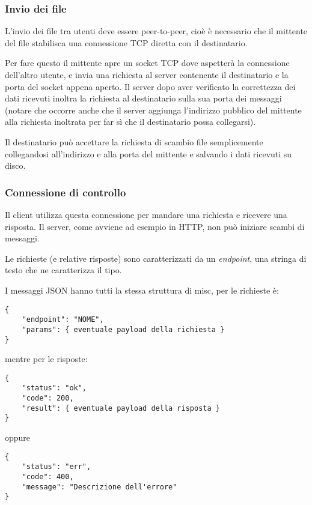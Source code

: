 \subsubsection{Invio dei file}
L'invio dei file tra utenti deve essere peer-to-peer, cioè è necessario che il mittente del file stabilisca una connessione TCP diretta con il destinatario.

Per fare questo il mittente apre un socket TCP dove aspetterà la connessione dell'altro utente, e invia una richiesta al server contenente il destinatario e la porta del socket appena aperto. Il server dopo aver verificato la correttezza dei dati ricevuti inoltra la richiesta al destinatario sulla sua porta dei messaggi (notare che occorre anche che il server aggiunga l'indirizzo pubblico del mittente alla richiesta inoltrata per far sì che il destinatario possa collegarsi).

Il destinatario può accettare la richiesta di scambio file semplicemente collegandosi all'indirizzo e alla porta del mittente e salvando i dati ricevuti su disco.

\subsubsection{Connessione di controllo}
Il client utilizza questa connessione per mandare una richiesta e ricevere una risposta. Il server, come avviene ad esempio in HTTP, non può iniziare scambi di messaggi.

Le richieste (e relative risposte) sono caratterizzati da un \textit{endpoint}, una stringa di testo che ne caratterizza il tipo.

I messaggi JSON hanno tutti la stessa struttura di misc, per le richieste è:
\begin{verbatim}
{
    "endpoint": "NOME",
    "params": { eventuale payload della richiesta }
}
\end{verbatim}

mentre per le risposte:
\begin{verbatim}
{
    "status": "ok",
    "code": 200,
    "result": { eventuale payload della risposta }
}
\end{verbatim}

oppure
\begin{verbatim}
{
    "status": "err",
    "code": 400,
    "message": "Descrizione dell'errore"
}
\end{verbatim}

\medskip
